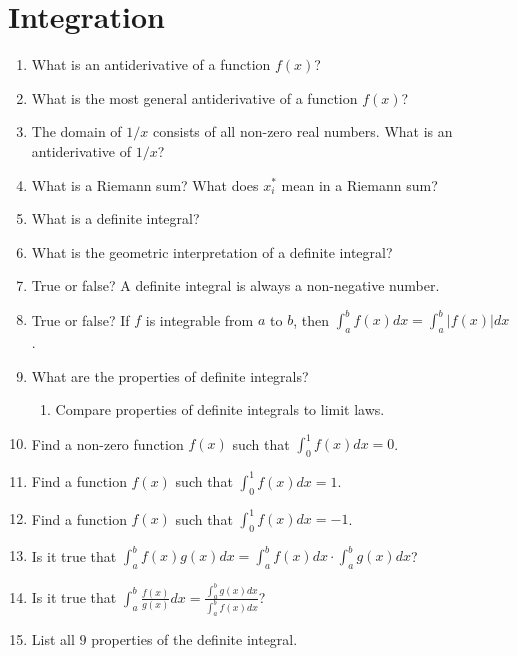 \documentclass[../main.tex]{subfiles}
\begin{document}
\section{Integration}
\begin{enumerate}[label=\thesection.\arabic*, align=left]
  \item What is an antiderivative of a function \(f(x)\)?
  \item What is the most general antiderivative of a function \(f(x)\)?
  \item The domain of \(1/x\) consists of all non-zero real numbers. What is an antiderivative of \(1/x\)?

  \item What is a Riemann sum? What does \(x^{*}_{i}\) mean in a Riemann sum?

  \item What is a definite integral?

  \item What is the geometric interpretation of a definite integral?

  \item True or false? A definite integral is always a non-negative number. 

  \item True or false? If \(f\) is integrable from \(a\) to \(b\), then \(\int_{a}^{b} f(x) dx = \int_{a}^{b} |f(x)| dx\).

  \item What are the properties of definite integrals?
    \begin{enumerate}
    \item Compare properties of definite integrals to limit laws. 
    \end{enumerate}

  \item Find a non-zero function \(f(x)\) such that \(\int_{0}^{1} f(x) dx = 0\).
  \item Find a function \(f(x)\) such that \(\int_{0}^{1} f(x) dx = 1\).
  \item Find a function \(f(x)\) such that \(\int_{0}^{1} f(x) dx = -1\).

  \item Is it true that \(\int_{a}^{b} f(x)g(x) dx = \int_{a}^{b} f(x) dx \cdot \int_{a}^{b} g(x) dx\)?
  \item Is it true that \(\int_{a}^{b} \frac{f(x)}{g(x)} dx = \frac{\int_{a}^{b} g(x) dx}{\int_{a}^{b} f(x) dx}\)?

  \item List all \(9\) properties of the definite integral.


\end{enumerate}
\end{document}
